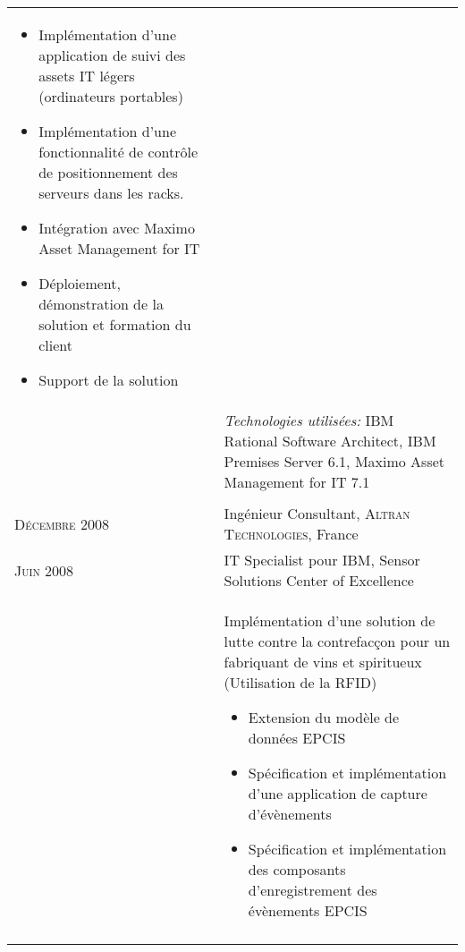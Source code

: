 \begin{longtable}{R{2.5cm}|p{14.8cm}}
{		\begin{itemize}
			\item Implémentation d'une application de suivi des assets IT légers (ordinateurs portables)
			\item Implémentation d'une fonctionnalité de contrôle de positionnement des serveurs dans les racks.
			\item Intégration avec Maximo Asset Management for IT
			\item Déploiement, démonstration de la solution et formation du client
			\item Support de la solution
		\end{itemize}
		\vspace{-1em}
	}                                                                                                                                                                   \\&
	\footnotesize{\emph{Technologies utilisées:} IBM Rational Software Architect, IBM Premises Server 6.1, Maximo Asset Management for IT 7.1 }                         \\
	                                                                                                                                                \\
	\textsc{Décembre 2008}  & Ingénieur Consultant, \textsc{Altran Technologies}, France                                                                                \\
	\textsc{Juin 2008}      & IT Specialist pour IBM, Sensor Solutions Center of Excellence                                                                             \\&
	\footnotesize{
		Implémentation d'une solution de lutte contre la contrefacçon pour un fabriquant de vins et spiritueux (Utilisation de la RFID)
		\begin{itemize}
			\item Extension du modèle de données EPCIS
			\item Spécification et implémentation d'une application de capture d'évènements
			\item Spécification et implémentation des  composants d'enregistrement des évènements EPCIS
		\end{itemize}
		\vspace{-1em}
	}                                                                                                                                                                   \\&

\end{longtable}
